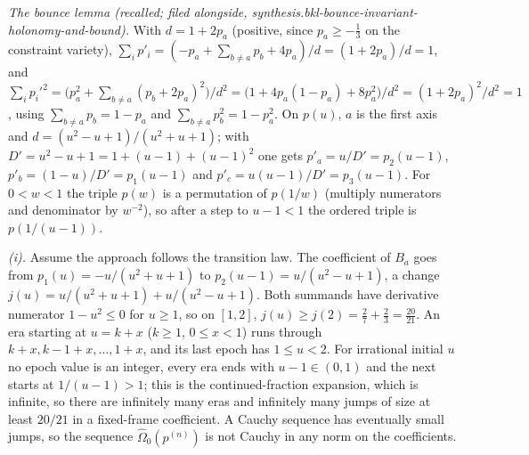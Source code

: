 \emph{The bounce lemma (recalled; filed alongside, synthesis.bkl-bounce-invariant-holonomy-and-bound).} With $d = 1 + 2p_{a}$ (positive, since $p_{a} \geq -\tfrac13$ on the constraint variety), $\sum_{i} p'_{i} = (-p_{a} + \sum_{b \neq a} p_{b} + 4p_{a})/d = (1 + 2p_{a})/d = 1$, and $\sum_{i} p_{i}'^{2} = \bigl(p_{a}^{2} + \sum_{b\neq a}(p_{b} + 2p_{a})^{2}\bigr)/d^{2} = \bigl(1 + 4p_{a}(1 - p_{a}) + 8p_{a}^{2}\bigr)/d^{2} = (1 + 2p_{a})^{2}/d^{2} = 1$, using $\sum_{b \ne a} p_{b} = 1 - p_{a}$ and $\sum_{b\neq a}p_{b}^{2} = 1 - p_{a}^{2}$. On $p(u)$, $a$ is the first axis and $d = (u^{2} - u + 1)/(u^{2} + u + 1)$; with $D' = u^{2} - u + 1 = 1 + (u - 1) + (u - 1)^{2}$ one gets $p'_{a} = u/D' = p_{2}(u - 1)$, $p'_{b} = (1 - u)/D' = p_{1}(u - 1)$ and $p'_{c} = u(u - 1)/D' = p_{3}(u - 1)$. For $0 < w < 1$ the triple $p(w)$ is a permutation of $p(1/w)$ (multiply numerators and denominator by $w^{-2}$), so after a step to $u - 1 < 1$ the ordered triple is $p(1/(u - 1))$.

\emph{(i).} Assume the approach follows the transition law. The coefficient of $B_{a}$ goes from $p_{1}(u) = -u/(u^{2} + u + 1)$ to $p_{2}(u - 1) = u/(u^{2} - u + 1)$, a change $j(u) = u/(u^{2} + u + 1) + u/(u^{2} - u + 1)$. Both summands have derivative numerator $1 - u^{2} \leq 0$ for $u \geq 1$, so on $[1, 2]$, $j(u) \geq j(2) = \tfrac27 + \tfrac23 = \tfrac{20}{21}$. An era starting at $u = k + x$ ($k \geq 1$, $0 \leq x < 1$) runs through $k + x, k - 1 + x, \ldots, 1 + x$, and its last epoch has $1 \leq u < 2$. For irrational initial $u$ no epoch value is an integer, every era ends with $u - 1 \in (0, 1)$ and the next starts at $1/(u - 1) > 1$; this is the continued-fraction expansion, which is infinite, so there are infinitely many eras and infinitely many jumps of size at least $20/21$ in a fixed-frame coefficient. A Cauchy sequence has eventually small jumps, so the sequence $\widehat\Omega_{0}(p^{(n)})$ is not Cauchy in any norm on the coefficients.

